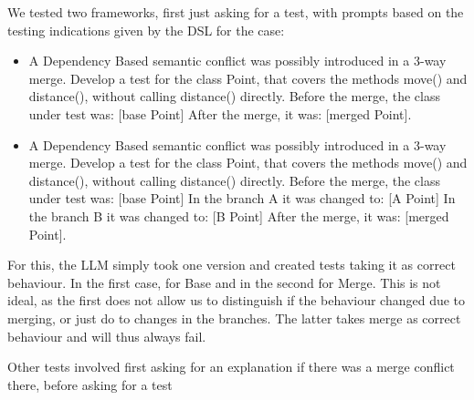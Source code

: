 We tested two frameworks, first just asking for a test, with prompts based on the testing indications given by the DSL for the case:

\begin{itemize}
  \item A Dependency Based semantic conflict was possibly introduced in a 3-way merge. Develop a test for the class Point, that covers the methods move() and distance(), without calling distance() directly.
Before the merge, the class under test was: [base Point]
After the merge, it was: [merged Point].
  \item A Dependency Based semantic conflict was possibly introduced in a 3-way merge. Develop a test for the class Point, that covers the methods move() and distance(), without calling distance() directly.
Before the merge, the class under test was: [base Point]
In the branch A it was changed to: [A Point]
In the branch B it was changed to: [B Point]
After the merge, it was: [merged Point].

\end{itemize}

For this, the LLM simply took one version and created tests taking it as correct behaviour. In the first case, for Base and in the second for Merge. This is not ideal, as the first does not allow us to distinguish if the behaviour changed due to merging, or just do to changes in the branches. The latter takes merge as correct behaviour and will thus always fail.

Other tests involved first asking for an explanation if there was a merge conflict there, before asking for a test

